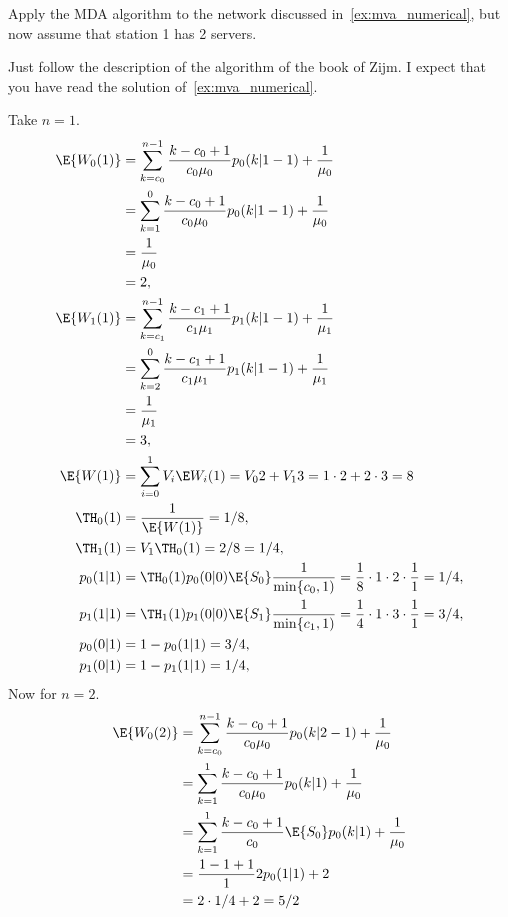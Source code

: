 \begin{exercise}
 Apply the MDA algorithm to the network discussed in~\cref{ex:mva_numerical}, but now assume that station 1 has 2 servers. 
\begin{hint}
 Just follow the description of the algorithm of the book of Zijm.
 I expect that you have read the solution of~\cref{ex:mva_numerical}.
\end{hint}
\begin{solution}
 Take $n=1$.
 \begin{align*}
 \E{W_0(1)} 
&= \sum_{k=c_0}^{n-1} \frac{k-c_0+1}{c_0 \mu_0} p_0(k|1-1) + \frac1{\mu_0} \\
&= \sum_{k=1}^{0} \frac{k-c_0+1}{c_0 \mu_0} p_0(k|1-1) + \frac1{\mu_0} \\
&= \frac1{\mu_0} \\
&= 2, \\
 \E{W_1(1)}
&= \sum_{k=c_1}^{n-1} \frac{k-c_1+1}{c_1 \mu_1} p_1(k|1-1) + \frac1{\mu_1} \\
&= \sum_{k=2}^{0} \frac{k-c_1+1}{c_1 \mu_1} p_1(k|1-1) + \frac1{\mu_1} \\
&= \frac1{\mu_1} \\
&= 3, \\
\E{W(1)} &= \sum_{i=0}^1 V_i \E W_i(1) = V_0 2 + V_1 3 = 1\cdot 2 + 2 \cdot 3 = 8\\
\TH_0(1) &= \frac{1}{\E{W(1)}} = 1/8, \\
\TH_1(1) &= V_1 \TH_0(1) = 2/8=1/4, \\
p_0(1|1) 
&= \TH_0(1)p_0(0|0)\E{S_0} \frac1{\min\{c_0,1)} = \frac18\cdot 1\cdot 2 \cdot \frac{1}{1}=1/4, \\ 
p_1(1|1) 
&= \TH_1(1)p_1(0|0)\E{S_1} \frac1{\min\{c_1,1)} = \frac14\cdot 1\cdot 3 \cdot \frac{1}{1}=3/4, \\
p_0(0|1) &= 1-p_0(1|1) = 3/4, \\
p_1(0|1) &= 1-p_1(1|1) = 1/4, \\
 \end{align*}
Now for $n=2$.
 \begin{align*}
 \E{W_0(2)}
&= \sum_{k=c_0}^{n-1} \frac{k-c_0+1}{c_0 \mu_0} p_0(k|2-1) + \frac1{\mu_0} \\
&= \sum_{k=1}^{1} \frac{k-c_0+1}{c_0 \mu_0} p_0(k|1) + \frac1{\mu_0} \\
&= \sum_{k=1}^{1} \frac{k-c_0+1}{c_0 }\E{S_0} p_0(k|1) + \frac1{\mu_0} \\
&= \frac{1-1+1}{1 }2 p_0(1|1) + 2 \\
&= 2\cdot 1/4 + 2 =5/2\\

\end{align*}
\end{solution}
\end{exercise}
